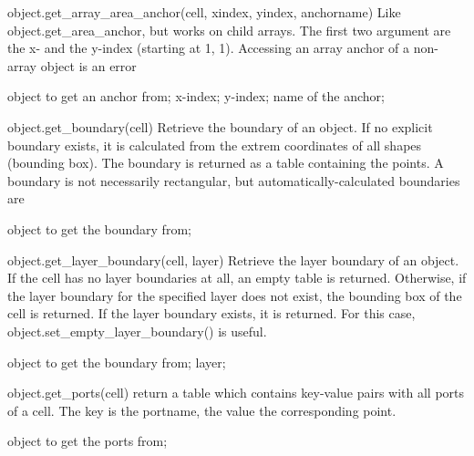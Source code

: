\begin{APIfunc}{object.get\_array\_area\_anchor(cell, xindex, yindex, anchorname)}
    Like object.get\_area\_anchor, but works on child arrays. The first two argument are the x- and the y-index (starting at 1, 1). Accessing an array anchor of a non-array object is an error
    \begin{APIparameters}
            object to get an anchor from;
            x-index;
            y-index;
            name of the anchor;
    \end{APIparameters}
\end{APIfunc}
\begin{APIfunc}{object.get\_boundary(cell)}
    Retrieve the boundary of an object. If no explicit boundary exists, it is calculated from the extrem coordinates of all shapes (bounding box). The boundary is returned as a table containing the points. A boundary is not necessarily rectangular, but automatically-calculated boundaries are
    \begin{APIparameters}
            object to get the boundary from;
    \end{APIparameters}
\end{APIfunc}
\begin{APIfunc}{object.get\_layer\_boundary(cell, layer)}
    Retrieve the layer boundary of an object. If the cell has no layer boundaries at all, an empty table is returned. Otherwise, if the layer boundary for the specified layer does not exist, the bounding box of the cell is returned. If the layer boundary exists, it is returned. For this case, object.set\_empty\_layer\_boundary() is useful.
    \begin{APIparameters}
            object to get the boundary from;
            layer;
    \end{APIparameters}
\end{APIfunc}
\begin{APIfunc}{object.get\_ports(cell)}
    return a table which contains key-value pairs with all ports of a cell. The key is the portname, the value the corresponding point.
    \begin{APIparameters}
            object to get the ports from;
    \end{APIparameters}
\end{APIfunc}
